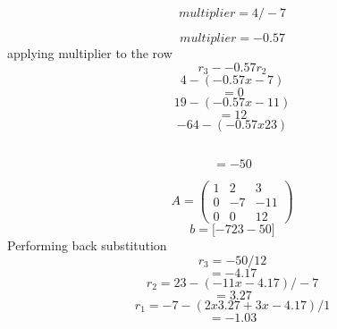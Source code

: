 \documentclass{article}%
\begin{document}
\subsection{	}%
\label{subsec:}%
\[%
	multiplier = 4  /  {-}7%
\]

%
\[%
		multiplier = {-}0.57%
\]%
\newline%
%
	applying multiplier to the row%
\[%
		r_3  {-}  {-}0.57 r_2%
\]%
\[%
		 4  {-} ( {-}0.57  x  {-}7 )%
\]%
\[%
			 =  0%
\]%
\[%
		 19  {-} ( {-}0.57  x  {-}11 )%
\]%
\[%
			 =  12%
\]%
\[%
		 {-}64  {-} ( {-}0.57  x  23 )%
\]%
\subsection{			}%
\label{subsec:}%
\[%
= {-}50%
\]

%
\[%
A = \begin{pmatrix}%
1&2&3\\%
0&-7&-11\\%
0&0&12%
\end{pmatrix}%
\]%
\[%
b = {[} {-}7  23 {-}50{]}%
\]%
\newline%
%
Performing back substitution%
\[%
	r_3 = {-}50  /  12%
\]%
\[%
		=  {-}4.17%
\]%
\[%
	r_2 = 23  {-}  ( {-}11  x  {-}4.17 )  /  {-}7%
\]%
\[%
		=  3.27%
\]%
\[%
	r_1 = {-}7  {-}  ( 2  x  3.27  +  3  x  {-}4.17 )  /  1%
\]%
\[%
		=  {-}1.03%
\]

%
\end{document}
